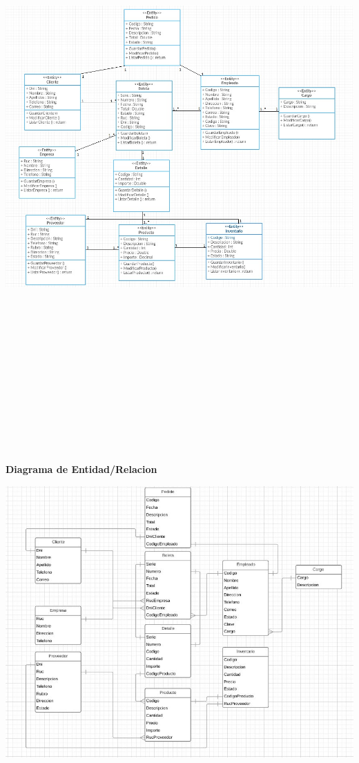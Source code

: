 \begin{flushleft}
\begin{center}
	\includegraphics[width=19cm]{./Imagenes/diagramaClases} 
	\end{center}
\textbf{}\\
\textbf{}\\
\textbf{}\\
\textbf{}\\
\textbf{}\\
\textbf{}\\
\textbf{}\\
\textbf{}\\
\textbf{}\\
\textbf{}\\
\textbf{}\\
\textbf{}\\
\textbf {Diagrama de Entidad/Relacion}\\
\begin{center}
	\includegraphics[width=19cm]{./Imagenes/entidad} 

\end{center}
\end{flushleft}
